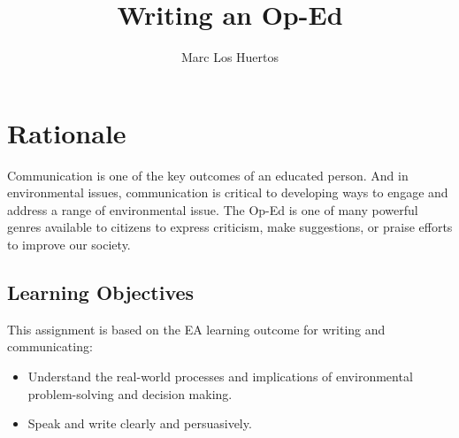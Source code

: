 \title{Writing an Op-Ed %
}
\author[Marc Los Huertos]{Marc Los Huertos}
\date{}  %



\setsidenotefont{\color{blue}}

\usepackage{booktabs}

\usepackage{multicol}

\newcommand{\docpkg}[1]{\texttt{#1}}%
\newcommand{\doccls}[1]{\texttt{#1}}%
\newcommand{\docclsopt}[1]{\texttt{#1}}%




\maketitle
\section{Rationale}

Communication is one of the key outcomes of an educated person. And in environmental issues, communication is critical to developing ways to engage and address a range of environmental issue. The Op-Ed is one of many powerful genres available to citizens to express criticism, make suggestions, or praise efforts to improve our society. 

\subsection{Learning Objectives}

This assignment is based on the EA learning outcome for writing and communicating: 

\begin{itemize}
	\item Understand the real-world processes and implications of environmental problem-solving and decision making.
	\item Speak and write clearly and persuasively.
\end{itemize}

